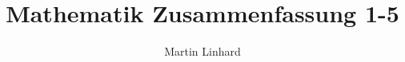 \documentclass{scrbook}
\begin{document}
\author{Martin Linhard}
\title{Mathematik Zusammenfassung 1-5}
\maketitle
\newpage
\tableofcontents

\end{document}
